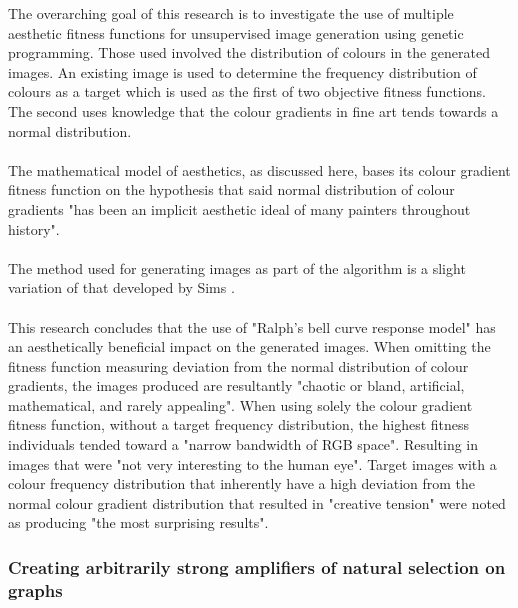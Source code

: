 \documentclass[10pt,a4paper]{article}
\begin{document}
The overarching goal of this research is to investigate the use of multiple aesthetic fitness functions for unsupervised image generation using genetic programming.
Those used involved the distribution of colours in the generated images.
An existing image is used to determine the frequency distribution of colours as a target which is used as the first of two objective fitness functions.
The second uses knowledge that the colour gradients in fine art tends towards a normal distribution.
\\\\
The mathematical model of aesthetics, as discussed here, bases its colour gradient fitness function on the hypothesis that said normal distribution of colour gradients "has been an implicit aesthetic ideal of many painters throughout history".
\\\\
The method used for generating images as part of the algorithm is a slight variation of that developed by Sims \cite{sims}.
\\\\
This research concludes that the use of "Ralph's bell curve response model" has an aesthetically beneficial impact on the generated images.
When omitting the fitness function measuring deviation from the normal distribution of colour gradients, the images produced are resultantly "chaotic or bland, artificial, mathematical, and rarely appealing".
When using solely the colour gradient fitness function, without a target frequency distribution, the highest fitness individuals tended toward a "narrow bandwidth of RGB space".
Resulting in images that were "not very interesting to the human eye".
Target images with a colour frequency distribution that inherently have a high deviation from the normal colour gradient distribution that resulted in "creative tension" were noted as producing "the most surprising results".


\subsubsection{Creating arbitrarily strong amplifiers of natural selection on graphs \cite{graph-amplifiers}}
\end{document}
